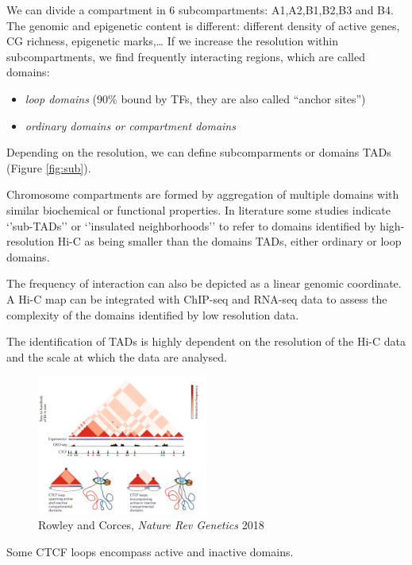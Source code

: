 We can divide a compartment in 6 subcompartments: A1,A2,B1,B2,B3 and B4. The genomic and epigenetic content is different: different density of active genes, CG richness, epigenetic marks,\ldots{} If we increase the resolution within subcompartments, we find frequently interacting regions, which are called domains:

\begin{itemize}
\tightlist
\item
  \emph{loop domains} (90\% bound by TFs, they are also called ``anchor sites'')
\item
  \emph{ordinary domains or compartment domains}
\end{itemize}

Depending on the resolution, we can define subcomparments or domains TADs (Figure \ref{fig:sub}).

Chromosome compartments are formed by aggregation of multiple domains with similar biochemical or functional properties. In literature some studies indicate `'sub-TADs'' or `'insulated neighborhoods'' to refer to domains identified by high-resolution Hi-C as being smaller than the domains TADs, either ordinary or loop domains.

The frequency of interaction can also be depicted as a linear genomic coordinate. A Hi-C map can be integrated with ChIP-seq and RNA-seq data to assess the complexity of the domains identified by low resolution data.

The identification of TADs is highly dependent on the resolution of the Hi-C data and the scale at which the data are analysed.

\begin{figure}
\centering
\includegraphics[width=0.5\textwidth]{../_resources/Screenshot_2022-10-19_at_09-20-57.png}
\caption{Rowley and Corces, \emph{Nature Rev Genetics} 2018}
\end{figure}

Some CTCF loops encompass active and inactive domains.

